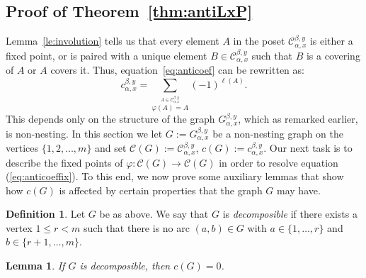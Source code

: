 \documentclass[10pt]{amsart}
\newtheorem{lemma}[theorem]{Lemma}
\theoremstyle{definition}
\newtheorem{defi}[theorem]{Definition}
\begin{document}
\subsection{Proof of Theorem~\ref{thm:antiLxP}}\label{ss:proof1} Lemma~\ref{le:involution} tells us that every element $A$ in the poset $\mathcal{C}_{\alpha,x}^{\beta,y}$ is either a fixed point, or is paired with a unique element $B\in\mathcal{C}_{\alpha,x}^{\beta,y}$ such that $B$ is a covering of $A$ or $A$ covers it. Thus, equation~\eqref{eq:anticoef} can be rewritten as:
\begin{equation}\label{eq:anticoeffix}
 c_{\alpha,x}^{\beta,y}=\sum_{\stackrel{A\in \mathcal{C}_{\alpha,x}^{\beta,y}} %
 {\varphi(A)=A}} (-1)^{\ell(A)}.
\end{equation}
This depends only on the structure of the graph $G_{\alpha,x}^{\beta,y}$, which as remarked earlier, is non-nesting. In this section we let $G:=G_{\alpha,x}^{\beta,y}$ be a non-nesting graph on the vertices $\{1,2,\ldots, m\}$ and set $\mathcal{C}(G):= \mathcal{C}_{\alpha,x}^{\beta,y}$, $c(G) := c_{\alpha,x}^{\beta,y}$. Our next task is to describe the fixed points of $\varphi\colon \mathcal{C}(G)\to \mathcal{C}(G)$ in order to resolve equation (\ref{eq:anticoeffix}). To this end, we now prove some auxiliary lemmas that show how $c(G)$ is affected by certain properties that the graph $G$ may have.

\begin{defi}\label{def:decomposible}
Let $G$ be as above. We say that $G$ is \emph{decomposible} if there exists a vertex $1\leq r<m$ such that there is no arc $(a,b)\in G$ with $a\in\{1,\dots ,r\}$ and $b\in\{r+1,\dots,m\}$.

\end{defi}

\begin{lemma}\label{le:decomposible}
 If $G$ is decomposible, then $c(G)=0$.
\end{lemma}
\end{document}
